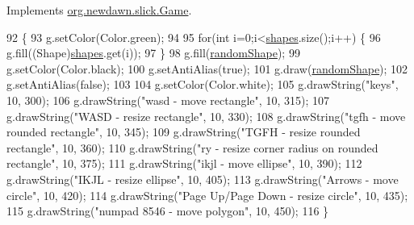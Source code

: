 Implements \mbox{\hyperlink{interfaceorg_1_1newdawn_1_1slick_1_1_game_af1a4670d43eb3ba04dfcf55ab1975b64}{org.\+newdawn.\+slick.\+Game}}.


\begin{DoxyCode}
92                                                             \{
93         g.setColor(Color.green);
94         
95         \textcolor{keywordflow}{for}(\textcolor{keywordtype}{int} i=0;i<\mbox{\hyperlink{classorg_1_1newdawn_1_1slick_1_1tests_1_1_shape_test_a860a3cef8eb3e35b677c5ccef30b3ecc}{shapes}}.size();i++) \{
96             g.fill((Shape)\mbox{\hyperlink{classorg_1_1newdawn_1_1slick_1_1tests_1_1_shape_test_a860a3cef8eb3e35b677c5ccef30b3ecc}{shapes}}.get(i));
97         \}
98         g.fill(\mbox{\hyperlink{classorg_1_1newdawn_1_1slick_1_1tests_1_1_shape_test_a6a63648419db86ebc316f549aef8254a}{randomShape}});
99         g.setColor(Color.black);
100         g.setAntiAlias(\textcolor{keyword}{true});
101         g.draw(\mbox{\hyperlink{classorg_1_1newdawn_1_1slick_1_1tests_1_1_shape_test_a6a63648419db86ebc316f549aef8254a}{randomShape}});
102         g.setAntiAlias(\textcolor{keyword}{false});
103         
104         g.setColor(Color.white);
105         g.drawString(\textcolor{stringliteral}{"keys"}, 10, 300);
106         g.drawString(\textcolor{stringliteral}{"wasd - move rectangle"}, 10, 315);
107         g.drawString(\textcolor{stringliteral}{"WASD - resize rectangle"}, 10, 330);
108         g.drawString(\textcolor{stringliteral}{"tgfh - move rounded rectangle"}, 10, 345);
109         g.drawString(\textcolor{stringliteral}{"TGFH - resize rounded rectangle"}, 10, 360);
110         g.drawString(\textcolor{stringliteral}{"ry - resize corner radius on rounded rectangle"}, 10, 375);
111         g.drawString(\textcolor{stringliteral}{"ikjl - move ellipse"}, 10, 390);
112         g.drawString(\textcolor{stringliteral}{"IKJL - resize ellipse"}, 10, 405);
113         g.drawString(\textcolor{stringliteral}{"Arrows - move circle"}, 10, 420);
114         g.drawString(\textcolor{stringliteral}{"Page Up/Page Down - resize circle"}, 10, 435);
115         g.drawString(\textcolor{stringliteral}{"numpad 8546 - move polygon"}, 10, 450);
116     \}
\end{DoxyCode}
\mbox{\label{classorg_1_1newdawn_1_1slick_1_1tests_1_1_shape_test_a986222bcf6c780f48ffb0f379c2f2ec8}} 
